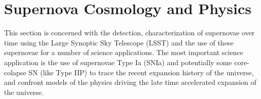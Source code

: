 %
%
%
%
%
%
%

\section{Supernova Cosmology and Physics}
\def\secname{supernovae}\label{sec:\secname}



This section is concerned with the detection, characterization of supernovae 
over time using the Large Synoptic Sky Telescope (LSST) and the use of these
supernovae for a number of science applications. The most important science 
application is the use of supernovae Type Ia (SNIa) and potentially some core-colapse SN (like Type IIP) to trace the recent expansion history of the universe,
and confront models of the physics driving the late time accelerated expansion
of the universe. 

